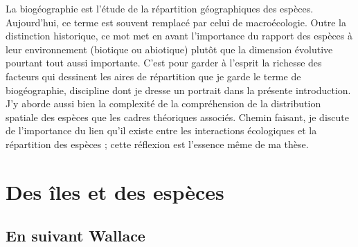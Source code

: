 La biogéographie est l'étude de la répartition géographiques des
espèces. Aujourd'hui, ce terme est souvent remplacé par celui de
macroécologie. Outre la distinction historique, ce mot met en avant
l'importance du rapport des espèces à leur environnement (biotique ou
abiotique) plutôt que la dimension évolutive pourtant tout aussi
importante. C'est pour garder à l'esprit la richesse des facteurs qui
dessinent les aires de répartition que je garde le terme de
biogéographie, discipline dont je dresse un portrait dans la présente
introduction. J'y aborde aussi bien la complexité de la compréhension de
la distribution spatiale des espèces que les cadres théoriques associés.
Chemin faisant, je discute de l'importance du lien qu'il existe entre
les interactions écologiques et la répartition des espèces ; cette
réflexion est l'essence même de ma thèse.

\section*{Des îles et des espèces}\label{des-uxeeles-et-des-espuxe8ces}

\subsection*{En suivant Wallace}\label{en-suivant-wallace}


